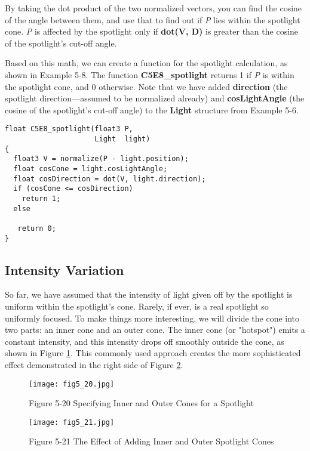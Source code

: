 \documentclass[../main.tex]{subfiles}
\begin{document}
By taking the dot product of the two normalized vectors, you can find the cosine of the angle between them, and use that to find out if \textit{P} lies within the spotlight cone. \textit{P} is affected by the spotlight only if \textbf{dot(V, D)} is greater than the cosine of the spotlight's cut-off angle.

Based on this math, we can create a function for the spotlight calculation, as shown in Example 5-8. The function \textbf{C5E8_spotlight} returns 1 if \textit{P} is within the spotlight cone, and 0 otherwise. Note that we have added \textbf{direction} (the spotlight direction—assumed to be normalized already) and \textbf{cosLightAngle} (the cosine of the spotlight's cut-off angle) to the \textbf{Light} structure from Example 5-6.

\FloatBarrier
\begin{lstlisting}[caption=Example 5-8. The \textbf{C5E8_spotlight} Internal Function]
float C5E8_spotlight(float3 P,
                     Light  light)
{
  float3 V = normalize(P - light.position);
  float cosCone = light.cosLightAngle;
  float cosDirection = dot(V, light.direction);
  if (cosCone <= cosDirection)
    return 1;
  else
    
   return 0;
}
\end{lstlisting}
\FloatBarrier

\subsection*{Intensity Variation}

So far, we have assumed that the intensity of light given off by the spotlight is uniform within the spotlight's cone. Rarely, if ever, is a real spotlight so uniformly focused. To make things more interesting, we will divide the cone into two parts: an inner cone and an outer cone. The inner cone (or "hotspot") emits a constant intensity, and this intensity drops off smoothly outside the cone, as shown in Figure \ref{fig:5-20}. This commonly used approach creates the more sophisticated effect demonstrated in the right side of Figure \ref{fig:5-21}.

\begin{figure}
    \centering
    \texttt{[image: fig5\_20.jpg]}
    \caption{Figure 5-20 Specifying Inner and Outer Cones for a Spotlight}
    \label{fig:5-20}
\end{figure}

\begin{figure}
    \centering
    \texttt{[image: fig5\_21.jpg]}
    \caption{Figure 5-21 The Effect of Adding Inner and Outer Spotlight Cones}
    \label{fig:5-21}
\end{figure}
\end{document}

